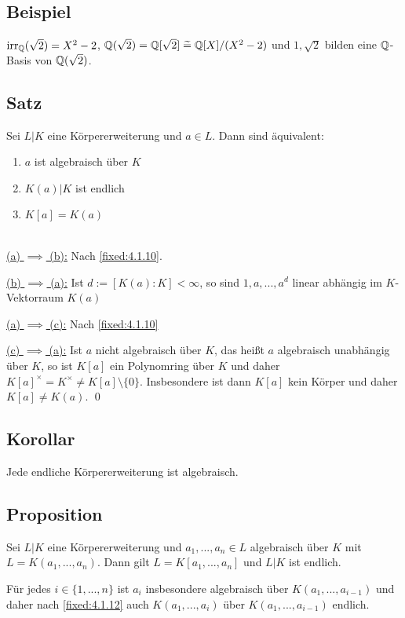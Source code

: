 \subsection{Beispiel} $\operatorname{irr}_\mathbb Q(\sqrt 2) = X^2 - 2$, $\mathbb Q(\sqrt 2) = \mathbb Q[\sqrt 2] \mathrel{\widetilde{=}} \mathbb Q[X] / (X^2 - 2)$ und $1, \sqrt 2$ bilden eine $\mathbb Q$-Basis von $\mathbb Q(\sqrt 2)$.

\subsection{Satz} Sei $L|K$ eine Körpererweiterung und $a \in L$. Dann sind äquivalent:
\begin{enumerate}[label=(\alph*)]
	\item
		$a$ ist algebraisch über $K$
		
	\item
		$K(a)|K$ ist endlich
		
	\item
		$K[a] = K(a)$
\end{enumerate}

\proof ~\\
\underline{(a) $\implies$ (b):} Nach \ref{fixed:4.1.10}.

\underline{(b) $\implies$ (a):} Ist $d := [K(a) : K] < \infty$, so sind $1,a,...,a^d$ linear abhängig im $K$-Vektorraum $K(a)$

\underline{(a) $\implies$ (c):} Nach \ref{fixed:4.1.10}

\underline{(c) $\implies$ (a):} Ist $a$ nicht algebraisch über $K$, das heißt $a$ algebraisch unabhängig über $K$, so ist $K[a]$ ein Polynomring über $K$ und daher $K[a]^\times = K^\times \neq K[a] \setminus \{0\}$. Insbesondere ist dann $K[a]$ kein Körper und daher $K[a] \neq K(a)$. \qed

\subsection{Korollar} Jede endliche Körpererweiterung ist algebraisch.

\subsection{Proposition} Sei $L|K$ eine Körpererweiterung und $a_1,...,a_n \in L$ algebraisch über $K$ mit $L = K(a_1,...,a_n)$. Dann gilt $L = K[a_1,...,a_n]$ und $L|K$ ist endlich.

\proof Für jedes $i \in \{1,...,n\}$ ist $a_i$ insbesondere algebraisch über $K(a_1,...,a_{i-1})$ und daher nach \ref{fixed:4.1.12} auch $K(a_1,...,a_i)$ über $K(a_1,...,a_{i-1})$ endlich.

